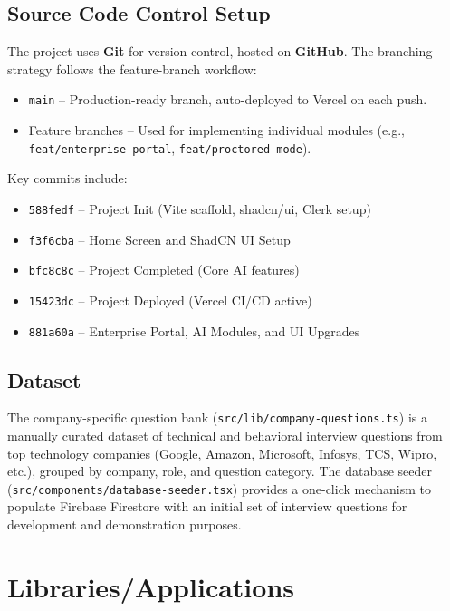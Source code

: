 \subsection{Source Code Control Setup}
The project uses \textbf{Git} for version control, hosted on \textbf{GitHub}. The branching strategy follows the feature-branch workflow:
\begin{itemize}
	\item \texttt{main} -- Production-ready branch, auto-deployed to Vercel on each push.
	\item Feature branches -- Used for implementing individual modules (e.g., \texttt{feat/enterprise-portal}, \texttt{feat/proctored-mode}).
\end{itemize}
Key commits include:
\begin{itemize}
	\item \texttt{588fedf} -- Project Init (Vite scaffold, shadcn/ui, Clerk setup)
	\item \texttt{f3f6cba} -- Home Screen and ShadCN UI Setup
	\item \texttt{bfc8c8c} -- Project Completed (Core AI features)
	\item \texttt{15423dc} -- Project Deployed (Vercel CI/CD active)
	\item \texttt{881a60a} -- Enterprise Portal, AI Modules, and UI Upgrades
\end{itemize}

\subsection{Dataset}
The company-specific question bank (\texttt{src/lib/company-questions.ts}) is a manually curated
dataset of technical and behavioral interview questions from top technology companies (Google,
Amazon, Microsoft, Infosys, TCS, Wipro, etc.), grouped by company, role, and question category.
The database seeder (\texttt{src/components/database-seeder.tsx}) provides a one-click mechanism
to populate Firebase Firestore with an initial set of interview questions for development and
demonstration purposes.

\section{Libraries/Applications}

